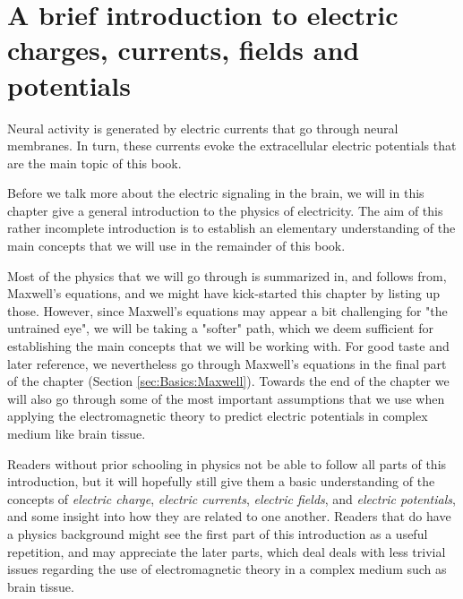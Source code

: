 \chapter{A brief introduction to electric charges, currents, fields and potentials} 
\label{chap:Basics}

Neural activity is generated by electric currents that go through neural membranes. In turn, these currents
evoke the extracellular electric potentials that are the main topic of this book. 

Before we talk more about the electric signaling in the brain, we will in this chapter give a general introduction to the physics of electricity. The aim of this rather incomplete introduction is to establish an elementary understanding of the main concepts that we will use in the remainder of this book. 

Most of the physics that we will go through is summarized in, and follows from, Maxwell's equations, and we might have kick-started this chapter by listing up those. However, since Maxwell's equations may appear a bit challenging for "the untrained eye", we will be taking a "softer" path, which we deem sufficient for establishing the main concepts that we will be working with. For good taste and later reference, we nevertheless go through Maxwell's equations in the final part of the chapter (Section \ref{sec:Basics:Maxwell}). Towards the end of the chapter we will also go through some of the most important assumptions that we use when applying the electromagnetic theory to predict electric potentials in complex medium like brain tissue.

Readers without prior schooling in physics  not be able to follow all parts of this introduction, but it will hopefully still give them a basic understanding of the concepts of \textit{electric charge}, \textit{electric currents}, \textit{electric fields}, and \textit{electric potentials}, and some insight into how they are related to one another. Readers that do have a physics background might see the first part of this introduction as a useful repetition, and may appreciate the later parts, which deal deals with less trivial issues regarding the use of electromagnetic theory in a complex medium such as brain tissue. 




